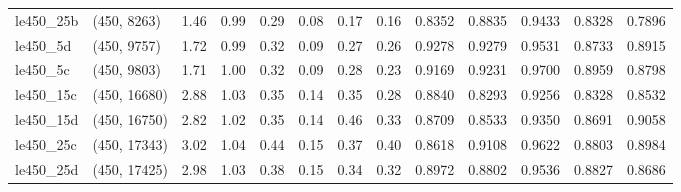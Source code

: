 \begin{tabular}{llrrrrrrrrrrr}
 le450\_25b &  (450, 8263) &  1.46 & 0.99 & 0.29 & 0.08 &  0.17 &   0.16 &   0.8352 &   0.8835 &    0.9433 &     0.8328 &      0.7896 \\
  le450\_5d &  (450, 9757) &  1.72 & 0.99 & 0.32 & 0.09 &  0.27 &   0.26 &   0.9278 &   0.9279 &    0.9531 &     0.8733 &      0.8915 \\
  le450\_5c &  (450, 9803) &  1.71 & 1.00 & 0.32 & 0.09 &  0.28 &   0.23 &   0.9169 &   0.9231 &    0.9700 &     0.8959 &      0.8798 \\
 le450\_15c & (450, 16680) &  2.88 & 1.03 & 0.35 & 0.14 &  0.35 &   0.28 &   0.8840 &   0.8293 &    0.9256 &     0.8328 &      0.8532 \\
 le450\_15d & (450, 16750) &  2.82 & 1.02 & 0.35 & 0.14 &  0.46 &   0.33 &   0.8709 &   0.8533 &    0.9350 &     0.8691 &      0.9058 \\
 le450\_25c & (450, 17343) &  3.02 & 1.04 & 0.44 & 0.15 &  0.37 &   0.40 &   0.8618 &   0.9108 &    0.9622 &     0.8803 &      0.8984 \\
 le450\_25d & (450, 17425) &  2.98 & 1.03 & 0.38 & 0.15 &  0.34 &   0.32 &   0.8972 &   0.8802 &    0.9536 &     0.8827 &      0.8686 \\
\bottomrule
\end{tabular}
